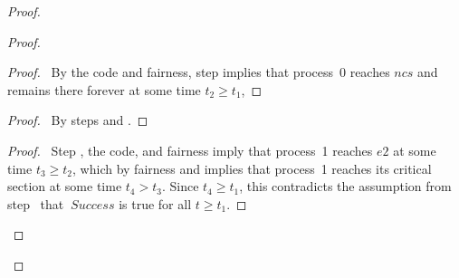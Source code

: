 \documentclass[fleqn,leqno]{article}
\begin{document}
\begin{proof}
\begin{proof}

     \begin{proof}
     \pf\ By the code and fairness, step 
     implies that process~0 reaches $ncs$ and remains there forever at some
     time $t_{2}\geq t_{1}$, 
     \end{proof}
     \begin{proof}
     \pf\ By steps  and .
     \end{proof}

   \qedstep
     \begin{proof}
      \pf\ Step , the code, and fairness imply that process~1 
      reaches $e2$ at some time $t_{3}\geq t_{2}$, which by fairness
      and 
      implies that process~1 reaches its critical section at
      some time $t_{4}>t_{3}$.  Since $t_{4}\geq t_{1}$, this contradicts
      the assumption from step~ that $~Success$ is true for 
      all $t\geq t_{1}$.
     \end{proof}



\end{proof}
\end{proof}
\end{document}

